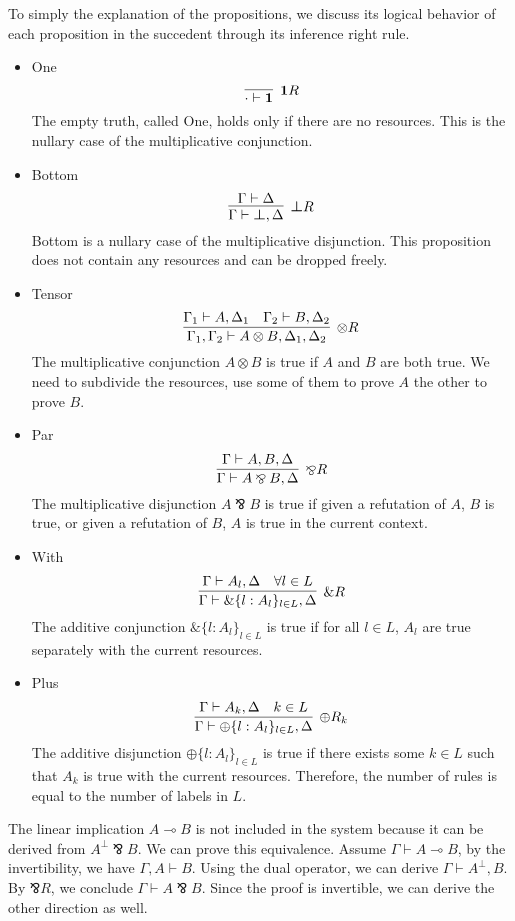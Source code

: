 \documentclass[12pt, openany]{memoir}
\newcommand*{\pare}[0]{\mathbin{\bindnasrepma}}
\begin{document}
To simply the explanation of the propositions, we discuss its logical behavior of each proposition in the succedent
through its inference right rule.
\begin{itemize}
  \item One
  \[
    \infer[\textbf{1}R]{\cdot \vdash \textbf{1}}{}
  \]
  The empty truth, called One, holds only if there are no resources. 
  This is the nullary case of the multiplicative conjunction.
  \item Bottom
  \[
    \infer[\boldsymbol{\bot} R]{\Gamma \vdash \boldsymbol{\bot}, \Delta}{
      \Gamma \vdash \Delta
    }
  \]
  Bottom is a nullary case of the multiplicative disjunction.
  This proposition does not contain any resources and can be dropped freely.
  \item Tensor
  \[
    \infer[\otimes R]{\Gamma_1, \Gamma_2 \vdash A \otimes B, \Delta_1, \Delta_2}{
      \Gamma_1 \vdash A, \Delta_1
      &
      \Gamma_2 \vdash B, \Delta_2
    }
  \]
  The multiplicative conjunction $A \otimes B$ is true if $A$ and $B$ are both true.
  We need to subdivide the resources, use some of them to prove $A$ the other to prove $B$. 
  \item Par
  \[
    \infer[\pare R]{\Gamma \vdash A \pare B, \Delta}{
      \Gamma \vdash A, B, \Delta
    }
  \]
  The multiplicative disjunction $A \pare B$ is true if given a refutation of $A$, $B$ is true,
  or given a refutation of $B$, $A$ is true in the current context.
  \item With
  \[
    \infer[\& R]{\Gamma \vdash \&\{l : A_l\}_{l \in L}, \Delta}{
      \Gamma \vdash A_l, \Delta
      &
      \forall l \in L
    }
  \]
  The additive conjunction $\&\{l : A_l\}_{l \in L}$ is true if for all $l \in L$, $A_l$ are true separately with the current resources.
  \item Plus
  \[
    \infer[\oplus R_k]{\Gamma \vdash \oplus\{l : A_l\}_{l \in L}, \Delta}{
      \Gamma \vdash A_k, \Delta
      &
      k \in L
    }
  \]
  The additive disjunction $\oplus\{l : A_l\}_{l \in L}$ is true if there exists some $k \in L$ such that $A_k$ is true with the current resources.
  Therefore, the number of rules is equal to the number of labels in $L$.
\end{itemize}
The linear implication $A \multimap B$ is not included in the system because it can be derived from $A^\bot \pare B$.
We can prove this equivalence. Assume $\Gamma \vdash A \multimap B$, 
by the invertibility, we have $\Gamma, A \vdash B$.
Using the dual operator, we can derive $\Gamma \vdash A^\bot, B$.
By $\pare R$, we conclude $\Gamma \vdash A \pare B$.
Since the proof is invertible, we can derive the other direction as well.
\end{document}
